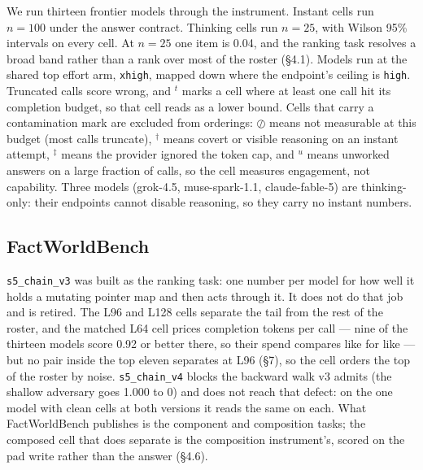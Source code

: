 \documentclass[11pt]{article}
\newcommand{\marku}{$^{u}$}
\newcommand{\marktrunc}{$^{t}$}
\newcommand{\markdag}{$^{\dagger}$}
\newcommand{\markddag}{$^{\ddagger}$}
\newcommand{\censored}{$\oslash$}
\newcommand{\code}[1]{\texttt{#1}}
\begin{document}
We run thirteen frontier models through the instrument. Instant cells
run $n=100$ under the answer contract. Thinking cells run $n=25$, with Wilson 95\% intervals on
every cell. At $n=25$ one item is 0.04, and the ranking task resolves a broad band rather than a
rank over most of the roster (\S4.1). Models run
at the shared top effort arm, \code{xhigh}, mapped down where the endpoint's ceiling is
\code{high}. Truncated calls score wrong, and \marktrunc{} marks a cell where at least one call
hit its completion budget, so that cell reads as a lower bound. Cells that carry a contamination
mark are excluded from orderings: \censored{} means not measurable at this budget (most calls
truncate), \markdag{} means covert or visible reasoning on an instant attempt, \markddag{} means
the provider ignored the token cap, and \marku{} means unworked answers on a large fraction of
calls, so the cell measures engagement, not capability. Three models (grok-4.5, muse-spark-1.1,
claude-fable-5) are thinking-only: their endpoints cannot disable reasoning, so they carry no
instant numbers.

\subsection{FactWorldBench}

\code{s5\_chain\_v3} was built as the ranking task: one number per model for how well it holds
a mutating pointer map and then acts through it. It does not do that job and is retired. The L96
and L128 cells separate the tail from the rest of the roster, and the matched L64 cell prices
completion tokens per call --- nine of the thirteen models score 0.92 or better there, so their
spend compares like for like --- but no pair inside the top eleven separates at L96 (\S7), so
the cell orders the top of the roster by noise. \code{s5\_chain\_v4} blocks the backward walk
v3 admits (the shallow adversary goes 1.000 to 0) and does not reach that defect: on the one
model with clean cells at both versions it reads the same on each. What FactWorldBench publishes
is the component and composition tasks; the composed cell that does separate is the composition
instrument's, scored on the pad write rather than the answer (\S4.6).
\end{document}
